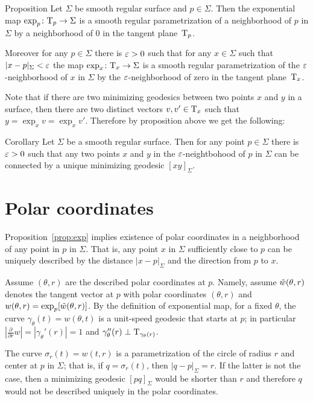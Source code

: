 \begin{thm}{Proposition}\label{prop:exp}
Let $\Sigma$ be smooth regular surface and $p\in \Sigma$.
Then the exponential map $\exp_p\:\T_p\to \Sigma$ is a smooth regular parametrization of a neighborhood of $p$ in $\Sigma$ by a neighborhood of $0$ in the tangent plane~$\T_p$.

Moreover for any $p\in \Sigma$ there is $\eps>0$ such that for any $x\in \Sigma$ such that $|x-p|_\Sigma<\eps$ the map 
$\exp_x\:\T_x\to \Sigma$ is a smooth regular parametrization of the $\eps$-neighborhood of $x$ in $\Sigma$ by the $\eps$-neighborhood of zero in the tangent plane~$\T_x$.
\end{thm}

Note that if there are two minimizing geodesics between two points $x$ and $y$ in a surface,
then there are two distinct vectors $v,v'\in \T_x$ such that $y=\exp_xv=\exp_xv'$.
Therefore by proposition above we get the following:

\begin{thm}{Corollary}
Let $\Sigma$ be a smooth regular surface.
Then for any point $p\in\Sigma$ there is $\eps>0$ such that any two points $x$ and $y$ in the $\eps$-neightbohood of $p$ in $\Sigma$ can be connected by a unique minimizing geodesic $[xy]_\Sigma$.
\end{thm}


\section{Polar coordinates}

Proposition~\ref{prop:exp} implies existence of polar coordinates in a neighborhood of any point in $p$ in $\Sigma$.
That is, any point $x$ in $\Sigma$ sufficiently close to $p$ 
can be uniquely described by the distance $|x-p|_\Sigma$ and the direction from $p$ to $x$.

Assume $(\theta,r)$ are the described polar coordinates at $p$.
Namely, assume $\~w(\theta,r)$ denotes the tangent vector at $p$ with polar coordinates $(\theta,r)$ and $w( \theta,r)=\exp_p[\~w(\theta,r)]$.
By the definition of exponential map, for a fixed $\theta$, the curve $\gamma_\theta(t)=w(\theta,t)$ is a unit-speed geodesic that starts at $p$;
in particular $|\tfrac{\partial}{\partial r}w|=|\gamma_\theta'(r)|=1$ and $\gamma''_\theta(r)\perp\T_{\gamma_\theta(r)}$.

The curve $\sigma_r(t)=w(t,r)$ is a parametrization of the circle of radius $r$ and center at $p$ in $\Sigma$; that is, if $q=\sigma_r(t)$, then $|q-p|_\Sigma=r$.
If the latter is not the case, then a minimizing geodesic $[pq]_\Sigma$ would be shorter than $r$ and therefore $q$ would not be described uniquely in the polar coordinates. 

